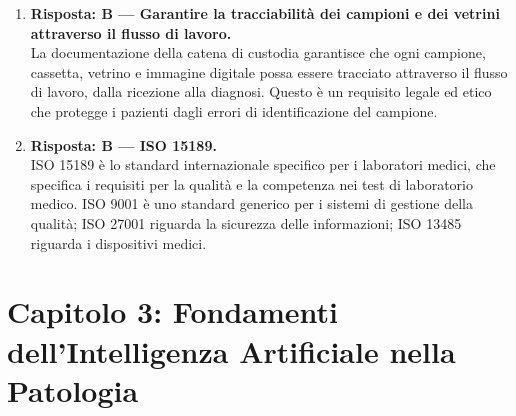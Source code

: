 \begin{enumerate}
    \item \textbf{Risposta: B --- Garantire la tracciabilità dei campioni e dei vetrini attraverso
    il flusso di lavoro.}\\
    La documentazione della catena di custodia garantisce che ogni campione, cassetta, vetrino e
    immagine digitale possa essere tracciato attraverso il flusso di lavoro, dalla ricezione alla
    diagnosi. Questo è un requisito legale ed etico che protegge i pazienti dagli errori di
    identificazione del campione.

    \item \textbf{Risposta: B --- ISO 15189.}\\
    ISO 15189 è lo standard internazionale specifico per i laboratori medici, che specifica i
    requisiti per la qualità e la competenza nei test di laboratorio medico. ISO 9001 è uno
    standard generico per i sistemi di gestione della qualità; ISO 27001 riguarda la sicurezza
    delle informazioni; ISO 13485 riguarda i dispositivi medici.

\end{enumerate}

\section*{Capitolo 3: Fondamenti dell'Intelligenza Artificiale nella Patologia}

